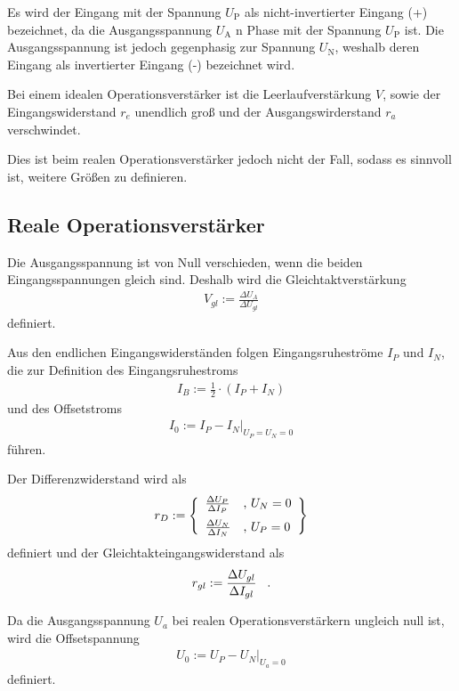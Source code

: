 \documentclass[]{scrartcl}
\begin{document}
Es wird der Eingang mit der Spannung $U_{\text{P}}$ als nicht-invertierter Eingang (+) bezeichnet, da die Ausgangsspannung $U_{\text{A}}$ n Phase mit der Spannung $U_{\text{P}}$ ist.
Die Ausgangsspannung ist jedoch gegenphasig zur Spannung $U_{\text{N}}$, weshalb deren Eingang als invertierter Eingang (-) bezeichnet wird.

Bei einem idealen Operationsverstärker ist die Leerlaufverstärkung $V$, sowie der Eingangswiderstand $r_{e}$ unendlich groß und der Ausgangswirderstand $r_a$ verschwindet.

Dies ist beim realen Operationsverstärker jedoch nicht der Fall, sodass es sinnvoll ist, weitere Größen zu definieren.

\subsection{Reale Operationsverstärker}
Die Ausgangsspannung ist von Null verschieden, wenn die beiden Eingangsspannungen gleich sind. Deshalb wird die Gleichtaktverstärkung
\begin{align}
 V_{gl}:=\frac{\Delta U_{A}}{\Delta U_{gl}}
\end{align}
definiert.

Aus den endlichen Eingangswiderständen folgen Eingangsruheströme $I_{P}$ und $I_{N}$, die zur Definition des Eingangsruhestroms
\begin{align}
 I_{B}:=\frac{1}{2} \cdot \left(I_{P}+I_{N}\right)
\end{align}
und des Offsetstroms
\begin{align}
 I_{0}:= \left. I_{P}-I_{N}\right|_{U_{P}=U_{N}=0} 
\end{align}
führen.

Der Differenzwiderstand wird als
\begin{align}
 r_{D}:=\left\lbrace 
\begin{array}{ll}
\frac{\Delta U_{P}}{\Delta I_{P}} & \text{, }U_{N}=0 \vspace{0.2cm}\\
\frac{\Delta U_{N}}{\Delta I_{N}} & \text{, }U_{P}=0
\end{array}
\right\rbrace 
\end{align}
definiert und der Gleichtakteingangswiderstand als
\begin{align}
 r_{gl}:=\frac{\Delta U_{gl}}{\Delta I_{gl}} \hspace{0.3cm}\text{.}
\end{align}

Da die Ausgangsspannung $U_{a}$ bei realen Operationsverstärkern ungleich null ist, wird die Offsetspannung
\begin{align}
 U_0:=\left. U_{P}-U_{N} \right|_{U_{a}=0}
\end{align}
definiert.
\end{document}
